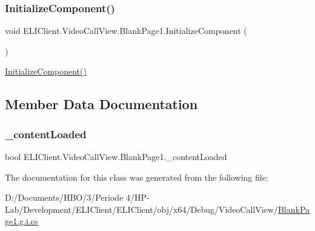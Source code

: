 \subsubsection{\texorpdfstring{Initialize\+Component()}{InitializeComponent()}}
{\footnotesize\ttfamily void E\+L\+I\+Client.\+Video\+Call\+View.\+Blank\+Page1.\+Initialize\+Component (\begin{DoxyParamCaption}{ }\end{DoxyParamCaption})\hspace{0.3cm}{\ttfamily [inline]}}



\hyperlink{class_e_l_i_client_1_1_video_call_view_1_1_blank_page1_acf68a80b35fbd1ff82e0e825ae9c1941}{Initialize\+Component()} 



\subsection{Member Data Documentation}
\mbox{\label{class_e_l_i_client_1_1_video_call_view_1_1_blank_page1_a24183bacd9fc76491bebcbe754dc5d3e}} 
\subsubsection{\texorpdfstring{\+\_\+content\+Loaded}{\_contentLoaded}}
{\footnotesize\ttfamily bool E\+L\+I\+Client.\+Video\+Call\+View.\+Blank\+Page1.\+\_\+content\+Loaded\hspace{0.3cm}{\ttfamily [private]}}



The documentation for this class was generated from the following file\+:\begin{DoxyCompactItemize}
\item 
D\+:/\+Documents/\+H\+B\+O/3/\+Periode 4/\+H\+P-\/\+Lab/\+Development/\+E\+L\+I\+Client/\+E\+L\+I\+Client/obj/x64/\+Debug/\+Video\+Call\+View/\hyperlink{_blank_page1_8g_8i_8cs}{Blank\+Page1.\+g.\+i.\+cs}\end{DoxyCompactItemize}
